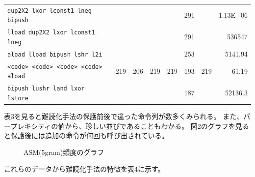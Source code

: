 \documentclass[a4j,fleqn,10pt]{jarticle}
\begin{document}
\begin{table}[t]
{\begin{tabular}{lrrrrrrr}
    \texttt{dup2X2 lxor lconst1 lneg bipush}   &     &     &     &     & 291 &     & 1.13E+06 \\
    \texttt{lload dup2X2 lxor lconst1 lneg}    &     &     &     &     & 291 &     & 536547 \\
    \texttt{aload lload bipush lshr l2i}       &     &     &     &     & 253 &     & 5141.94 \\
    \texttt{<code> <code> <code> <code> aload} & 219 & 206 & 219 & 219 & 193 & 219 & 61.19 \\
    \texttt{bipush lushr land lxor lstore}     &     &     &     &     & 187 &     & 52136.3 \\
  \end{tabular}}
\end{table}



表3を見ると難読化手法の保護前後で違った命令列が数多くみられる。
また、パープレキシティの値から、珍しい並びであることもわかる。
図2のグラフを見ると保護後には追加の命令が何回も呼び出されている。

\begin{figure}[b]
  \centering
  \begin{minipage}[t]{0.49\textwidth}
  \end{minipage}
  \caption{ASM(5gram)頻度のグラフ}\label{fig:graph}
\end{figure}


これらのデータから難読化手法の特徴を表4に示す。
\end{document}
